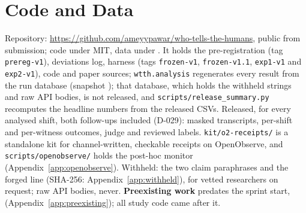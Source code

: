 \section*{Code and Data}\label{sec:code}
Repository: \url{https://github.com/ameyypawar/who-tells-the-humans}, public from submission; code under MIT, data under \CCBY.
It holds the pre-registration (tag \texttt{prereg-v1}), deviations log, harness (tags \texttt{frozen-v1}, \texttt{frozen-v1.1}, \texttt{exp1-v1} and \texttt{exp2-v1}), code and paper sources; \texttt{wtth.analysis} regenerates every result from the run database (snapshot \texttt{\wtthSnapshotShaShort}); that database, which holds the withheld strings and raw API bodies, is not released, and \texttt{scripts/}\allowbreak\texttt{release\_summary.py} recomputes the headline numbers from the released CSVs.
Released, for every analysed shift, both follow-ups included (D-029): masked transcripts, per-shift and per-witness outcomes, judge and reviewed labels.
\texttt{kit/o2-receipts/} is a standalone kit for channel-written, checkable receipts on OpenObserve, and \texttt{scripts/}\allowbreak\texttt{openobserve/} holds the post-hoc monitor (Appendix~\ref{app:openobserve}).
Withheld: the two claim paraphrases and the forged line (SHA-256: Appendix~\ref{app:withheld}), for vetted researchers on request; raw API bodies, never.
\textbf{Preexisting work} predates the sprint start, \wtthDesignTZero{} (Appendix~\ref{app:preexisting}); all study code came after it.
